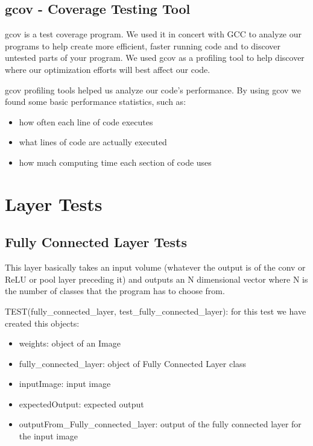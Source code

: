 \documentclass[parskip=full]{scrartcl}
\newcommand\tab[1][1cm]{\hspace*{#1}}
\begin{document}
    \subsection{gcov - Coverage Testing Tool}
    \tab gcov is a test coverage program. We used it in concert with GCC to analyze our programs to help create more efficient, faster running code and to discover untested parts of your program. We used gcov as a profiling tool to help discover where our optimization efforts will best affect our code.
    
    \tab gcov profiling tools helped us analyze our code's performance. By using gcov we found some basic performance statistics, such as:
    \begin{itemize}
        \item how often each line of code executes
        \item what lines of code are actually executed
        \item how much computing time each section of code uses
    \end{itemize}
    

\section{Layer Tests}

   \subsection {Fully Connected Layer Tests}
   \tab This layer basically takes an input volume (whatever the output is of the conv or ReLU or pool layer preceding it) and outputs an N dimensional vector where N is the number of classes that the program has to choose from.
   
   \tab TEST(fully_connected_layer, test_fully_connected_layer): for this test we have created this objects:
   \begin{itemize}
       \item weights: object of an Image
       \item fully_connected_layer: object of Fully Connected Layer class
       \item inputImage: input image
       \item expectedOutput: expected output
       \item outputFrom_Fully_connected_layer: output of the fully connected layer for the input image
   \end{itemize}
   
\end{document}
